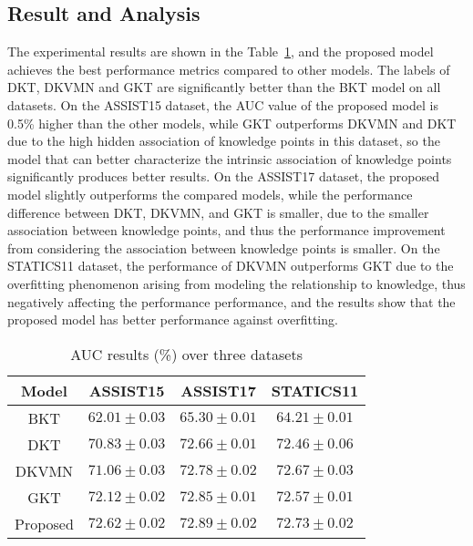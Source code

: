 \subsection{Result and Analysis}

The experimental results are shown in the Table~\ref{tbl:ch3-tb2}, and the proposed model achieves the best performance metrics compared to other models. The labels of DKT, DKVMN and GKT are significantly better than the BKT model on all datasets. On the ASSIST15 dataset, the AUC value of the proposed model is 0.5\% higher than the other models, while GKT outperforms DKVMN and DKT due to the high hidden association of knowledge points in this dataset, so the model that can better characterize the intrinsic association of knowledge points significantly produces better results. On the ASSIST17 dataset, the proposed model slightly outperforms the compared models, while the performance difference between DKT, DKVMN, and GKT is smaller, due to the smaller association between knowledge points, and thus the performance improvement from considering the association between knowledge points is smaller. On the STATICS11 dataset, the performance of DKVMN outperforms GKT due to the overfitting phenomenon arising from modeling the relationship to knowledge, thus negatively affecting the performance performance, and the results show that the proposed model has better performance against overfitting.

\begin{table}[h]
	\centering
	\caption{AUC results (\%) over three datasets}\label{tbl:ch3-tb2}
	\begin{tabular}{cccc}
		\toprule
		Model    & ASSIST15                    & ASSIST17                   & STATICS11                  \\
		\midrule
		BKT      & \(62.01\pm 0.03 \)          & \(65.30\pm 0.01\)          & \(64.21\pm 0.01\)          \\
		DKT      & \(70.83\pm 0.03 \)          & \(72.66\pm 0.01\)          & \(72.46\pm 0.06\)          \\
		DKVMN    & \(71.06\pm 0.03 \)          & \(72.78\pm 0.02\)          & \(72.67\pm 0.03\)          \\
		GKT      & \(72.12\pm 0.02 \)          & \(72.85\pm 0.01\)          & \(72.57\pm 0.01\)          \\
		\midrule
		Proposed & \(\mathbf{72.62\pm 0.02} \) & \(\mathbf{72.89\pm 0.02}\) & \(\mathbf{72.73\pm 0.02}\) \\
		\bottomrule
	\end{tabular}
\end{table}
